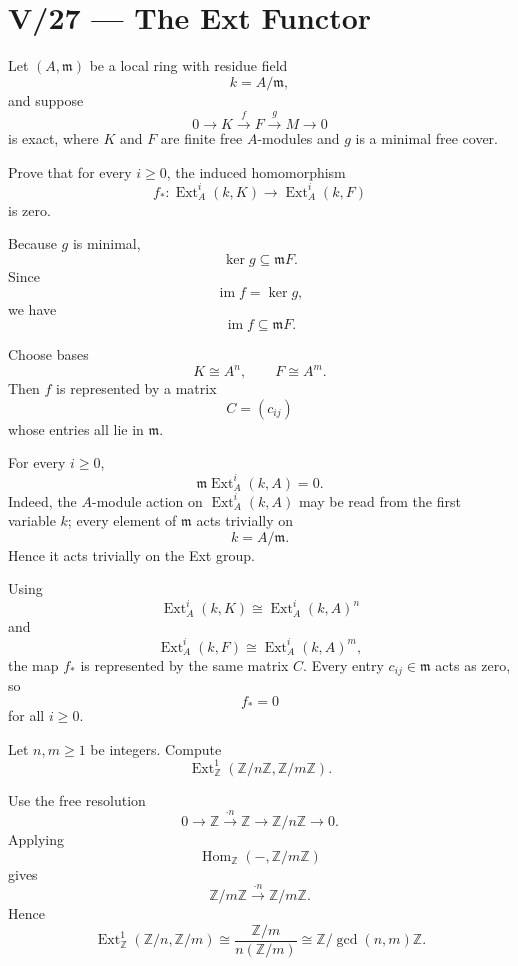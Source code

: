 \section*{V/27 --- The Ext Functor}

\begin{problem}[CP-V-0045]
\label{prob:cp-v-0045}
Let \((A,\mathfrak m)\) be a local ring with residue field
\[
k=A/\mathfrak m,
\]
and suppose
\[
0\longrightarrow K\xrightarrow{\,f\,}F\xrightarrow{\,g\,}M\longrightarrow0
\]
is exact, where \(K\) and \(F\) are finite free \(A\)-modules and \(g\) is a
minimal free cover.

Prove that for every \(i\ge0\), the induced homomorphism
\[
f_*:\operatorname{Ext}_A^i(k,K)\longrightarrow
\operatorname{Ext}_A^i(k,F)
\]
is zero.
\end{problem}

\begin{solution}
Because \(g\) is minimal,
\[
\ker g\subseteq\mathfrak mF.
\]
Since
\[
\operatorname{im}f=\ker g,
\]
we have
\[
\operatorname{im}f\subseteq\mathfrak mF.
\]

Choose bases
\[
K\cong A^n,\qquad F\cong A^m.
\]
Then \(f\) is represented by a matrix
\[
C=(c_{ij})
\]
whose entries all lie in \(\mathfrak m\).

For every \(i\ge0\),
\[
\mathfrak m\operatorname{Ext}_A^i(k,A)=0.
\]
Indeed, the \(A\)-module action on \(\operatorname{Ext}_A^i(k,A)\) may be
read from the first variable \(k\); every element of \(\mathfrak m\) acts
trivially on
\[
k=A/\mathfrak m.
\]
Hence it acts trivially on the Ext group.

Using
\[
\operatorname{Ext}_A^i(k,K)
\cong
\operatorname{Ext}_A^i(k,A)^n
\]
and
\[
\operatorname{Ext}_A^i(k,F)
\cong
\operatorname{Ext}_A^i(k,A)^m,
\]
the map \(f_*\) is represented by the same matrix \(C\). Every entry
\(c_{ij}\in\mathfrak m\) acts as zero, so
\[
f_*=0
\]
for all \(i\ge0\).
\end{solution}


\begin{problem}[CP-V-0113]
\label{prob:cp-v-0113}
Let \(n,m\ge1\) be integers. Compute
\[
\operatorname{Ext}^1_{\mathbb Z}(\mathbb Z/n\mathbb Z,\mathbb Z/m\mathbb Z).
\]
\end{problem}

\begin{solution}
Use the free resolution
\[
0\to\mathbb Z\xrightarrow{\cdot n}\mathbb Z\to\mathbb Z/n\mathbb Z\to0.
\]
Applying
\[
\operatorname{Hom}_{\mathbb Z}(-,\mathbb Z/m\mathbb Z)
\]
gives
\[
\mathbb Z/m\mathbb Z\xrightarrow{\cdot n}\mathbb Z/m\mathbb Z.
\]
Hence
\[
\operatorname{Ext}^1_{\mathbb Z}(\mathbb Z/n,\mathbb Z/m)
\cong
\frac{\mathbb Z/m}{n(\mathbb Z/m)}
\cong
\mathbb Z/\gcd(n,m)\mathbb Z.
\]
\end{solution}




